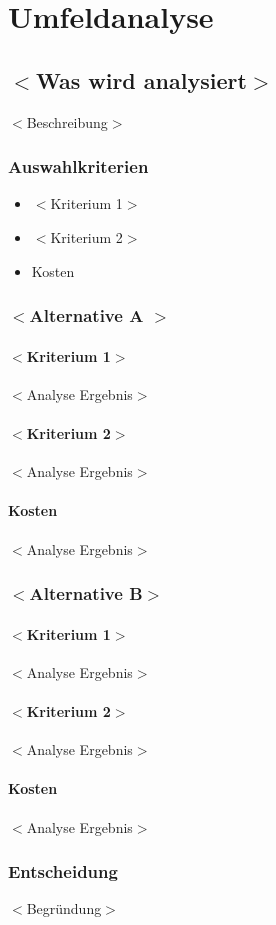 
	\chapter{Umfeldanalyse}
	\section{$<$Was wird analysiert$>$}
	{$<$Beschreibung$>$}
	\subsection{Auswahlkriterien}
	\begin{itemize}
		\item $<$Kriterium 1$>$
		\item $<$Kriterium 2$>$
		\item Kosten
	\end{itemize}
	\subsection{$<$Alternative A $>$}
	\subsubsection{$<$Kriterium 1$>$}
	$<$Analyse Ergebnis$>$
	\subsubsection{$<$Kriterium 2$>$}
	$<$Analyse Ergebnis$>$
	\subsubsection{Kosten}
	$<$Analyse Ergebnis$>$
	\subsection{$<$Alternative B$>$}
		\subsubsection{$<$Kriterium 1$>$}
	$<$Analyse Ergebnis$>$
	\subsubsection{$<$Kriterium 2$>$}
	$<$Analyse Ergebnis$>$
	\subsubsection{Kosten}
	$<$Analyse Ergebnis$>$
	
	\subsection{Entscheidung}
	$<$Begründung$>$
	